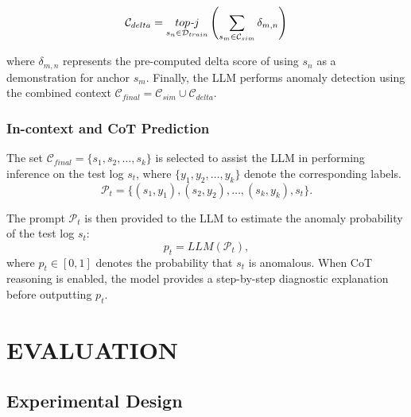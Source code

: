 \documentclass[lettersize,journal]{IEEEtran}
\begin{document}
\begin{equation}
\setlength{\abovedisplayskip}{3pt}
\setlength{\belowdisplayskip}{3pt}
\mathcal{C}_{delta} = \mathop{top\textit{-}j}_{s_n \in \mathcal{D}_{train}} \left( \sum_{s_m \in \mathcal{C}_{sim}} \delta_{m,n} \right)
\end{equation}

\noindent where $\delta_{m,n}$ represents the pre-computed delta score of using $s_n$ as a demonstration for anchor $s_m$. Finally, the LLM performs anomaly detection using the combined context $\mathcal{C}_{final} = \mathcal{C}_{sim} \cup \mathcal{C}_{delta}$.

\subsubsection{In-context and CoT Prediction}
The set $\mathcal{C}_{final} = \{s_{1}, s_{2}, \dots, s_{k}\}$ is selected to assist the LLM in performing inference on the test log $s_t$, where $\{y_{1}, y_{2}, \dots, y_{k}\}$ denote the corresponding labels.
\begin{equation}
\mathcal{P}_t = \{(s_{1}, y_{1}), (s_{2}, y_{2}), \dots, (s_{k}, y_{k}), s_t\}.
\end{equation}

The prompt $\mathcal{P}_t$ is then provided to the LLM to estimate the anomaly probability of the test log $s_t$:
\begin{equation}
p_t = \textit{LLM}(\mathcal{P}_t),
\end{equation}
where \(p_t \in [0,1]\) denotes the probability that \(s_t\) is anomalous.  
When CoT reasoning is enabled, the model provides a step-by-step diagnostic explanation before outputting \(p_t\).

\section{EVALUATION}

\subsection{Experimental Design}
\end{document}
